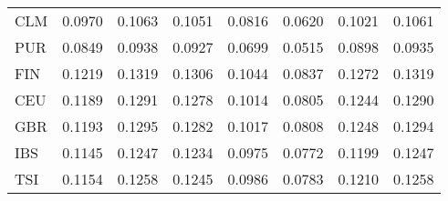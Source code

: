 \begin{table}[ht]
\begin{tabular}{|l|c|c|c|c|c|c|c|}
  CLM & 0.0970 & 0.1063 & 0.1051 & 0.0816 & 0.0620 & 0.1021 & 0.1061 \\ 
  PUR & 0.0849 & 0.0938 & 0.0927 & 0.0699 & 0.0515 & 0.0898 & 0.0935 \\ 
   \hline
FIN & 0.1219 & 0.1319 & 0.1306 & 0.1044 & 0.0837 & 0.1272 & 0.1319 \\ 
  CEU & 0.1189 & 0.1291 & 0.1278 & 0.1014 & 0.0805 & 0.1244 & 0.1290 \\ 
  GBR & 0.1193 & 0.1295 & 0.1282 & 0.1017 & 0.0808 & 0.1248 & 0.1294 \\ 
  IBS & 0.1145 & 0.1247 & 0.1234 & 0.0975 & 0.0772 & 0.1199 & 0.1247 \\ 
  TSI & 0.1154 & 0.1258 & 0.1245 & 0.0986 & 0.0783 & 0.1210 & 0.1258 \\ 
   \hline
\end{tabular}
\end{table}
